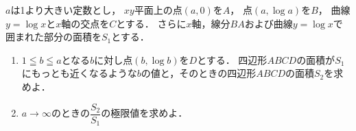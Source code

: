 \documentclass[../../main.tex]{subfiles}
\begin{document}
$a$は1より大きい定数とし，
$xy$平面上の点$(a,0)$を$A$，
点$(a,\log a)$を$B$，
曲線$y=\log x$と$x$軸の交点を$C$とする．
さらに$x$軸，線分$BA$および曲線$y=\log x$で囲まれた部分の面積を$S_1$とする．
\begin{enumerate}
  \item $1 \leqq b \leqq a$となる$b$に対し点$(b,\log b)$を$D$とする．
    四辺形$ABCD$の面積が$S_1$にもっとも近くなるような$b$の値と，そのときの四辺形$ABCD$の面積$S_2$を求めよ．
  \item $a\to\infty$のときの$\displaystyle\dfrac{S_2}{S_1}$の極限値を求めよ．
\end{enumerate}
\end{document}
